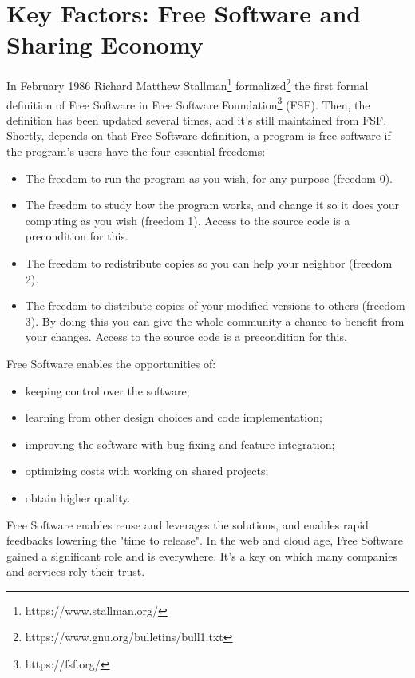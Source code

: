 \section{Key Factors: Free Software and Sharing
Economy}\label{key-factors-free-software-and-sharing-economy}

In February 1986 Richard Matthew Stallman\footnote{https://www.stallman.org/} formalized\footnote{https://www.gnu.org/bulletins/bull1.txt} the first formal definition of Free Software in Free Software Foundation\footnote{https://fsf.org/} (FSF).  Then, the definition has been updated several times, and it's still maintained from FSF.  Shortly, depends on that Free Software definition\cite{FreeSoftwareDefinition}, a program is free software if the program's users have the four essential freedoms:

\begin{itemize}
\item The freedom to run the program as you wish, for any purpose (freedom 0).
\item The freedom to study how the program works, and change it so it does your computing as you wish (freedom 1). Access to the source code is a precondition for this.
\item The freedom to redistribute copies so you can help your neighbor (freedom 2).
\item The freedom to distribute copies of your modified versions to others (freedom 3). By doing this you can give the whole community a chance to benefit from your changes. Access to the source code is a precondition for this.
\end{itemize}

Free Software enables the opportunities of:

\begin{itemize}
\item keeping control over the software;
\item learning from other design choices and code implementation;
\item improving the software with bug-fixing and feature integration;
\item optimizing costs with working on shared projects;
\item obtain higher quality.
\end{itemize}

Free Software enables reuse and leverages the solutions, and enables rapid feedbacks lowering the "time to release". In the web and cloud age, Free Software gained a significant role and is everywhere. It's a key on which many companies and services rely their trust.

